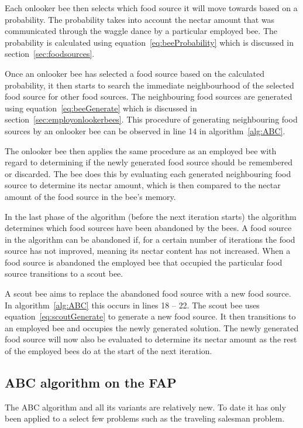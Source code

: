 Each onlooker bee then selects which food source it will move towards based on a probability. The probability takes into account the nectar amount that was communicated through the waggle dance by a particular employed bee. The probability is calculated using equation~\ref{eq:beeProbability} which is discussed in section~\ref{sec:foodsources}.

Once an onlooker bee has selected a food source based on the calculated probability, it then starts to search the immediate neighbourhood of the selected food source for other food sources. The neighbouring food sources are generated using equation~\ref{eq:beeGenerate} which is discussed in section~\ref{sec:employonlookerbees}. This procedure of generating neighbouring food sources by an onlooker bee can be observed in line 14 in algorithm~\ref{alg:ABC}.

The onlooker bee then applies the same procedure as an employed bee with regard to determining if the newly generated food source should be remembered or discarded. The bee does this by evaluating each generated neighbouring food source to determine its nectar amount, which is then compared to the nectar amount of the food source in the bee's memory.

In the last phase of the algorithm (before the next iteration starts) the algorithm determines which food sources have been abandoned by the bees. A food source in the algorithm can be abandoned if, for a certain number of iterations the food source has not improved, meaning its nectar content has not increased. When a food source is abandoned the employed bee that occupied the particular food source transitions to a scout bee.

A scout bee aims to replace the abandoned food source with a new food source. In algorithm~\ref{alg:ABC} this occurs in lines 18 -- 22. The scout bee uses equation~\ref{eq:scoutGenerate} to generate a new food source. It then transitions to an employed bee and occupies the newly generated solution. The newly generated food source will now also be evaluated to determine its nectar amount as the rest of the employed bees do at the start of the next iteration.


\subsection{ABC algorithm on the \gls{FAP}}
The \gls{ABC} algorithm and all its variants are relatively new. To date it has only been applied to a select few problems such as the traveling salesman problem.

